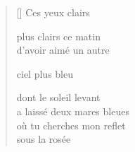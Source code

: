 \documentclass[12pt,a4paper]{article}
\begin{document}

\newpage

\poemtitle{}

\settowidth{\versewidth}{où tu cherches mon reflet}

\bigskip

\begin{verse}[\versewidth]
  Ces yeux clairs

  plus clairs ce matin \\
  d'avoir aimé un autre

  ciel plus bleu

  dont le soleil levant \\
  a laissé deux mares bleues \\
  où tu cherches mon reflet \\
  sous la rosée
\end{verse}


\newpage

\poemtitle{}

\settowidth{\versewidth}{l'haleine coupée à chaque descente}

\bigskip
\end{document}
